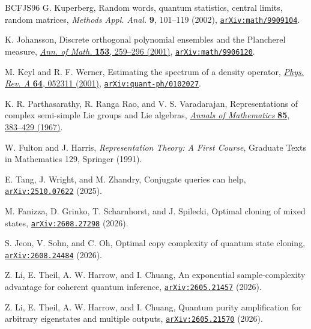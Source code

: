 \documentclass[11pt]{article}
\theoremstyle{remark}
\theoremstyle{plain}
\newcommand{\doi}[2]{\href{https://doi.org/#1}{#2}}
\newcommand{\arxiv}[1]{\href{https://arxiv.org/abs/#1}{\texttt{arXiv:#1}}}
\begin{document}
\begin{thebibliography}{BCFJS96}
G. Kuperberg,
Random words, quantum statistics, central limits, random matrices,
\emph{Methods Appl. Anal.} \textbf{9}, 101--119 (2002),
\arxiv{math/9909104}.

K. Johansson,
Discrete orthogonal polynomial ensembles and the Plancherel measure,
\doi{10.2307/2661375}{\emph{Ann. of Math.} \textbf{153}, 259--296 (2001)},
\arxiv{math/9906120}.

M. Keyl and R. F. Werner,
Estimating the spectrum of a density operator,
\doi{10.1103/PhysRevA.64.052311}{\emph{Phys. Rev. A} \textbf{64}, 052311 (2001)},
\arxiv{quant-ph/0102027}.

K. R. Parthasarathy, R. Ranga Rao, and V. S. Varadarajan,
Representations of complex semi-simple Lie groups and Lie algebras,
\doi{10.2307/1970351}{\emph{Annals of Mathematics} \textbf{85}, 383--429 (1967)}.

W. Fulton and J. Harris,
\emph{Representation Theory: A First Course},
Graduate Texts in Mathematics 129, Springer (1991).

E. Tang, J. Wright, and M. Zhandry,
Conjugate queries can help,
\arxiv{2510.07622} (2025).

M. Fanizza, D. Grinko, T. Scharnhorst, and J. Spilecki,
Optimal cloning of mixed states,
\arxiv{2608.27298} (2026).

S. Jeon, V. Sohn, and C. Oh,
Optimal copy complexity of quantum state cloning,
\arxiv{2608.24484} (2026).

Z. Li, E. Theil, A. W. Harrow, and I. Chuang,
An exponential sample-complexity advantage for coherent quantum inference,
\arxiv{2605.21457} (2026).

Z. Li, E. Theil, A. W. Harrow, and I. Chuang,
Quantum purity amplification for arbitrary eigenstates and multiple outputs,
\arxiv{2605.21570} (2026).

\end{thebibliography}
\end{document}
